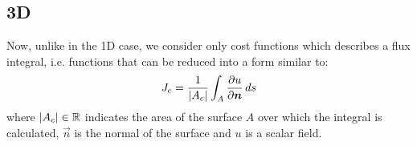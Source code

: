 




\subsection{3D}

Now, unlike in the 1D case, we consider only cost functions which describes a flux integral, i.e. functions that can be reduced into a form similar to:
\begin{equation}
	J_c = \frac{1}{\lvert A_c\rvert} \int_A \frac{\partial u}{\partial \boldsymbol{n}} \, ds
\end{equation}
where $\lvert A_c\rvert \in \mathbb{R}$ indicates the area of the surface $A$ over which the integral is calculated, $\vec{n}$ is the normal of the surface and $u$ is a scalar field.

